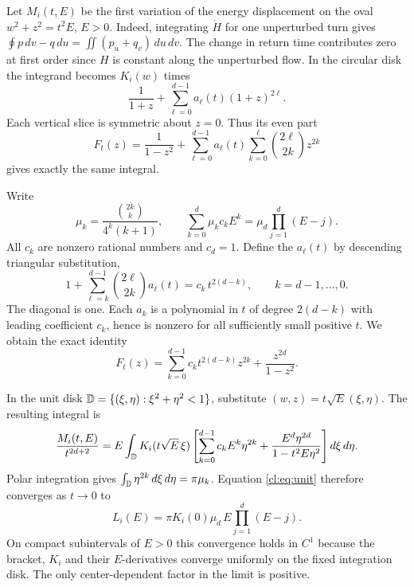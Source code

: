 Let \(M_i(t,E)\) be the first variation of the energy displacement
on the oval \(w^2+z^2=t^2 E\), \(E>0\). Indeed, integrating
\(\dot H\) for one unperturbed turn gives
\(\oint p\,dv-q\,du=\iint(p_u+q_v)\,du\,dv\).
The change in return time contributes zero at first order since \(H\)
is constant along the unperturbed flow. In the circular disk the
integrand becomes \(K_i(w)\) times
\[
 \frac{1}{1+z}+\sum_{\ell=0}^{d-1}a_\ell(t)(1+z)^{2\ell}.
\]
Each vertical slice is symmetric about \(z=0\). Thus its even part
\[
 F_t(z)=\frac{1}{1-z^2}+
 \sum_{\ell=0}^{d-1}a_\ell(t)\sum_{k=0}^\ell \binom{2\ell}{2k}z^{2k}
\]
gives exactly the same integral.

Write
\[
 \mu_k=\frac{\binom{2k}{k}}{4^k(k+1)},\qquad
 \sum_{k=0}^d\mu_k c_k E^k=\mu_d\prod_{j=1}^d(E-j).
\]
All \(c_k\) are nonzero rational numbers and \(c_d=1\).
Define the \(a_\ell(t)\) by descending triangular substitution,
\begin{equation}
 1+\sum_{\ell=k}^{d-1}\binom{2\ell}{2k}a_\ell(t)
      =c_k\,t^{2(d-k)},\qquad k=d-1,\ldots,0.       \label{cl:eq:triangular}
\end{equation}
The diagonal is one. Each \(a_k\) is a polynomial in \(t\) of degree
\(2(d-k)\) with leading coefficient \(c_k\), hence is nonzero for all
sufficiently small positive \(t\). We obtain the exact identity
\begin{equation}
 F_t(z)=\sum_{k=0}^{d-1}c_k t^{2(d-k)} z^{2k}
             +\frac{z^{2d}}{1-z^2}.                 \label{cl:eq:tail}
\end{equation}

In the unit disk \(\mathbb D=\{(\xi,\eta):\xi^2+\eta^2<1\}\), substitute
\((w,z)=t\sqrt E(\xi,\eta)\). The resulting integral is
\begin{align}
 \frac{M_i(t,E)}{t^{2d+2}}
 = E\int_{\mathbb D} K_i(t\sqrt E\,\xi)
 \left[\sum_{k=0}^{d-1}c_k E^k\eta^{2k}
 +\frac{E^d\eta^{2d}}{1-t^2E\eta^2}\right]d\xi\,d\eta .
 \label{cl:eq:unit}
\end{align}
Polar integration gives
\(\int_{\mathbb D}\eta^{2k}\,d\xi\,d\eta=\pi\mu_k\).
Equation \eqref{cl:eq:unit} therefore converges as \(t\to0\) to
\begin{equation}
 L_i(E)=\pi K_i(0)\mu_d\,E\prod_{j=1}^d(E-j).       \label{cl:eq:limit}
\end{equation}
On compact subintervals of \(E>0\) this convergence holds in \(C^1\)
because the bracket, \(K_i\) and their \(E\)-derivatives converge uniformly
on the fixed integration disk. The only center-dependent factor in
the limit is positive.

